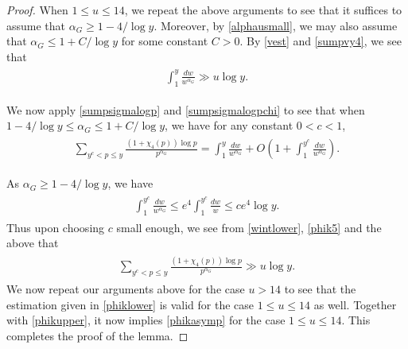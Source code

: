 \documentclass[twoside,leqno,10pt, A4]{amsart}
\begin{document}
\begin{proof}
  When $1 \leq u \leq 14$, we repeat the above arguments to see that it suffices to assume that $\alpha_G \geq 1-4/\log y$. Moreover, by \eqref{alphausmall}, we may also assume that $\alpha_G \leq 1+C/\log y$ for some constant $C>0$.  By \eqref{vest} and \eqref{sumpvy4}, we see that 
\begin{align}
\label{wintlower}
\begin{split}
  \int^y_1\frac {dw}{w^{\alpha_G}} \gg u \log y.
\end{split}
\end{align}   

  We now apply \eqref{sumpsigmalogp} and \eqref{sumpsigmalogpchi} to see that when $1-4/\log y \leq \alpha_G \leq 1+C/\log y$,  we have for any constant $0<c<1$, 
\begin{align}
\label{phik5}
\begin{split}
  \sum_{y^c < p \leq y}\frac {(1+\chi_4(p))\log p}{p^{\alpha_G}} =\int^y_{1}\frac {dw}{w^{\alpha_G}}+O(1+\int^{y^c}_1\frac {dw}{w^{\alpha_G}}).
\end{split}
\end{align}   
  
  As $\alpha_G \geq 1-4/\log y$, we have   
\begin{align*}
\begin{split}
 \int^{y^c}_1\frac {dw}{w^{\alpha_G}} \leq e^4\int^{y^c}_1\frac {dw}{w} \leq ce^4 \log y.
\end{split}
\end{align*}     
  Thus upon choosing $c$ small enough, we see from \eqref{wintlower}, \eqref{phik5} and the above that 
\begin{align*}
\begin{split}
  \sum_{y^c < p \leq y}\frac {(1+\chi_4(p))\log p}{p^{\alpha_G}} \gg u\log y. 
\end{split}
\end{align*}   
  We now repeat our arguments above for the case $u > 14$ to see that the estimation given in \eqref{phiklower} is valid for the case $1 \leq u \leq 14$ as well. Together with \eqref{phikupper}, it now implies \eqref{phikasymp} for the case  $1 \leq u \leq 14$. 
  This completes the proof of the lemma. 
\end{proof}
\end{document}
